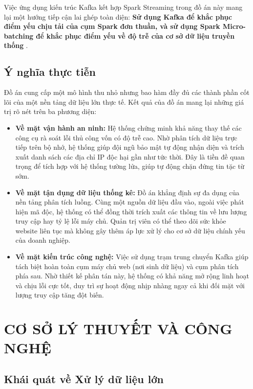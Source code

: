 \documentclass[12pt,a4paper]{report}
\begin{document}
Việc ứng dụng kiến trúc Kafka kết hợp Spark Streaming trong đồ án này mang lại một hướng tiếp cận lai ghép toàn diện: \textbf{Sử dụng Kafka để khắc phục điểm yếu chịu tải của cụm Spark đơn thuần, và sử dụng Spark Micro-batching để khắc phục điểm yếu về độ trễ của cơ sở dữ liệu truyền thống} \cite{kleppmann2017}.

\section{Ý nghĩa thực tiễn}
Đồ án cung cấp một mô hình thu nhỏ nhưng bao hàm đầy đủ các thành phần cốt lõi của một nền tảng dữ liệu lớn thực tế. Kết quả của đồ án mang lại những giá trị rõ nét trên ba phương diện:

\begin{itemize}
    \item \textbf{Về mặt vận hành an ninh:} Hệ thống chứng minh khả năng thay thế các công cụ rà soát lỗi thủ công vốn có độ trễ cao. Nhờ phân tích dữ liệu trực tiếp trên bộ nhớ, hệ thống giúp đội ngũ bảo mật tự động nhận diện và trích xuất danh sách các địa chỉ IP độc hại gần như tức thời. Đây là tiền đề quan trọng để tích hợp với hệ thống tường lửa, giúp tự động chặn đứng tin tặc từ sớm.
    
    \item \textbf{Về mặt tận dụng dữ liệu thống kê:} Đồ án khẳng định sự đa dụng của nền tảng phân tích luồng. Cùng một nguồn dữ liệu đầu vào, ngoài việc phát hiện mã độc, hệ thống có thể đồng thời trích xuất các thông tin về lưu lượng truy cập hay tỷ lệ lỗi máy chủ. Quản trị viên có thể theo dõi sức khỏe website liên tục mà không gây thêm áp lực xử lý cho cơ sở dữ liệu chính yếu của doanh nghiệp.
    
    \item \textbf{Về mặt kiến trúc công nghệ:} Việc sử dụng trạm trung chuyển Kafka giúp tách biệt hoàn toàn cụm máy chủ web (nơi sinh dữ liệu) và cụm phân tích phía sau. Nhờ thiết kế phân tán này, hệ thống có khả năng mở rộng linh hoạt và chịu lỗi cực tốt, duy trì sự hoạt động nhịp nhàng ngay cả khi đối mặt với lượng truy cập tăng đột biến.
\end{itemize}

\chapter{CƠ SỞ LÝ THUYẾT VÀ CÔNG NGHỆ}

\section{Khái quát về Xử lý dữ liệu lớn}
\end{document}
